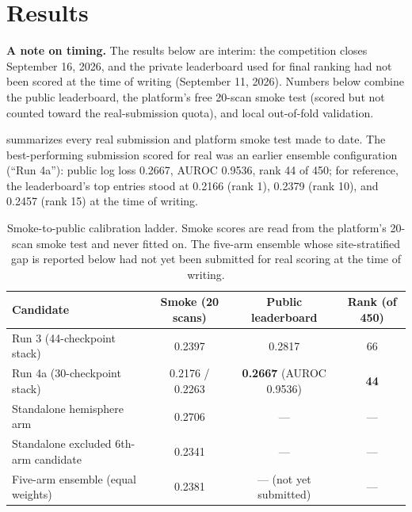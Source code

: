 \documentclass[11pt]{article}
\begin{document}
\section*{Results}
\label{sec:results}

\textbf{A note on timing.} The results below are interim: the competition closes September 16, 2026, and the private leaderboard used for final ranking had not been scored at the time of writing (September 11, 2026). Numbers below combine the public leaderboard, the platform's free 20-scan smoke test (scored but not counted toward the real-submission quota), and local out-of-fold validation.

 summarizes every real submission and platform smoke test made to date. The best-performing submission scored for real was an earlier ensemble configuration (``Run 4a''): public log loss 0.2667, AUROC 0.9536, rank 44 of 450; for reference, the leaderboard's top entries stood at 0.2166 (rank 1), 0.2379 (rank 10), and 0.2457 (rank 15) at the time of writing.

\begin{table}[h]
\centering
\small
\caption{Smoke-to-public calibration ladder. Smoke scores are read from the platform's 20-scan smoke test and never fitted on. The five-arm ensemble whose site-stratified gap is reported below had not yet been submitted for real scoring at the time of writing.}
\label{tab:ladder}
\begin{tabular}{@{}lccc@{}}
\toprule
\textbf{Candidate} & \textbf{Smoke (20 scans)} & \textbf{Public leaderboard} & \textbf{Rank (of 450)} \\
\midrule
Run 3 (44-checkpoint stack) & 0.2397 & 0.2817 & 66 \\
Run 4a (30-checkpoint stack) & 0.2176 / 0.2263 & \textbf{0.2667} (AUROC 0.9536) & \textbf{44} \\
Standalone hemisphere arm & 0.2706 & --- & --- \\
Standalone excluded 6th-arm candidate & 0.2341 & --- & --- \\
Five-arm ensemble (equal weights) & 0.2381 & --- (not yet submitted) & --- \\
\bottomrule
\end{tabular}
\end{table}
\end{document}
